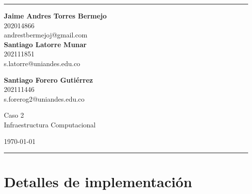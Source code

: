 \documentclass[a4paper]{article}
\begin{document}

\fancyhead[C]{}
\hrule \medskip %
\begin{minipage}{0.295\textwidth} 
\raggedright
\footnotesize
\textbf{Jaime Andres Torres Bermejo} \hfill\\   
202014866\hfill\\
andrestbermejoj@gmail.com\hfill\\

\textbf{Santiago Latorre Munar}\hfill\\
202111851\hfill\\
s.latorre@uniandes.edu.co

\textbf{Santiago Forero Gutiérrez} \hfill\\
202111446 \hfill\\
s.forerog2@uniandes.edu.co

\end{minipage}
\begin{minipage}{0.4\textwidth} 
\centering 
\large 
Caso 2\\ 
\normalsize 
Infraestructura Computacional\\ 
\end{minipage}
\begin{minipage}{0.295\textwidth} 
\raggedleft
\today\hfill\\
\end{minipage}
\medskip\hrule 
\bigskip

\section{Detalles de implementación}
\end{document}
